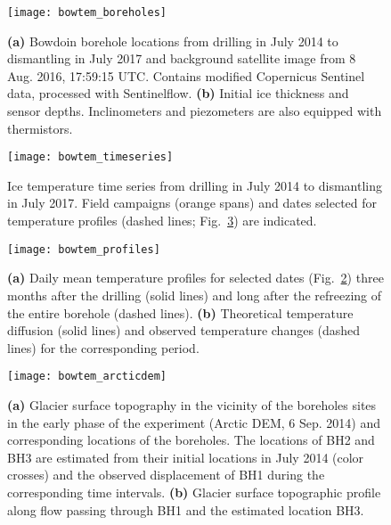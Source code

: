 \documentclass[utf8]{article}
\begin{document}
    \begin{figure}
      \centerline{\texttt{[image: bowtem\_boreholes]}}
      \caption{\textbf{(a)} Bowdoin borehole locations from drilling in July
               2014 to dismantling in July 2017 and background satellite
               image from 8 Aug. 2016, 17:59:15 UTC. Contains modified
               Copernicus Sentinel data, processed with Sentinelflow.
               \textbf{(b)} Initial ice thickness and sensor depths.
               Inclinometers and piezometers are also equipped with
               thermistors.}
      \label{fig:boreholes}
    \end{figure}

    \begin{figure}
      \centerline{\texttt{[image: bowtem\_timeseries]}}
      \caption{Ice temperature time series from drilling in July 2014 to
               dismantling in July 2017. Field campaigns (orange spans) and
               dates selected for temperature profiles (dashed lines;
               Fig.~\ref{fig:profiles}) are indicated.}
      \label{fig:timeseries}
    \end{figure}

    \begin{figure}
      \centerline{\texttt{[image: bowtem\_profiles]}}
      \caption{\textbf{(a)} Daily mean temperature profiles for selected dates
               (Fig.~\ref{fig:timeseries}) three months after the drilling
               (solid lines) and long after the refreezing of the entire
               borehole (dashed lines).
               \textbf{(b)} Theoretical temperature diffusion (solid lines) and
               observed temperature changes (dashed lines) for the
               corresponding period.}
      \label{fig:profiles}
    \end{figure}

    \begin{figure}
      \centerline{\texttt{[image: bowtem\_arcticdem]}}
      \caption{\textbf{(a)} Glacier surface topography in the vicinity of the
               boreholes sites in the early phase of the experiment (Arctic
               DEM, 6 Sep. 2014) and corresponding locations of the boreholes.
               The locations of BH2 and BH3 are estimated from their initial
               locations in July 2014 (color crosses) and the observed
               displacement of BH1 during the corresponding time intervals.
               \textbf{(b)} Glacier surface topographic profile along flow
               passing through BH1 and the estimated location BH3.}
      \label{fig:arcticdem}
    \end{figure}
\end{document}

